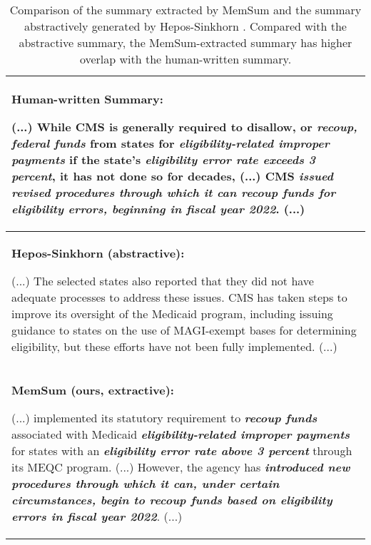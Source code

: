 \documentclass[11pt]{article}
\begin{document}
\begin{table}
\footnotesize
\centering
\begin{tabularx}{\linewidth}{X}
\toprule 
\textbf{Human-written Summary:}

(...) While CMS is generally required to disallow, or \textit{\textbf{\textcolor{blue!100}{recoup, federal funds}}} from states for \textit{\textbf{\textcolor{blue!100}{eligibility-related improper payments}}} if the state's \textit{\textbf{\textcolor{blue!100}{eligibility error rate exceeds 3 percent}}}, it has not done so for decades, (...)
CMS  \textit{\textbf{\textcolor{blue!100}{issued revised procedures through which it can recoup funds for eligibility errors, beginning in fiscal year 2022}}}. (...)\\
\hline
\textbf{Hepos-Sinkhorn (abstractive):}

(...)
The selected states also reported that they did not have adequate processes to address these issues. CMS has taken
steps to improve its oversight of the Medicaid program, including issuing guidance to states on the use of MAGI-exempt bases for determining eligibility, but these efforts have not been fully implemented. (...)\\
\hline
\textbf{MemSum (ours, extractive):}

(...)
implemented its statutory requirement to \textit{\textbf{\textcolor{blue!100}{recoup funds}}}  associated with Medicaid \textit{\textbf{\textcolor{blue!100}{eligibility-related improper payments}}} for states  with an \textit{\textbf{\textcolor{blue!100}{eligibility error rate above 3 percent}}} through its MEQC program. (...)
However, the agency has \textit{\textbf{\textcolor{blue!100}{introduced new procedures through which it  can, under certain circumstances, begin to recoup funds based on  eligibility errors in fiscal year 2022}}}. (...)
\\
\bottomrule
\end{tabularx}
\caption{ \label{tab:res_gov-report-sample}
Comparison of the summary extracted by MemSum and the summary abstractively generated by Hepos-Sinkhorn \cite{huang2021efficient}. Compared with the abstractive summary, the MemSum-extracted summary has higher overlap with the human-written summary.} 
\end{table}
\end{document}
